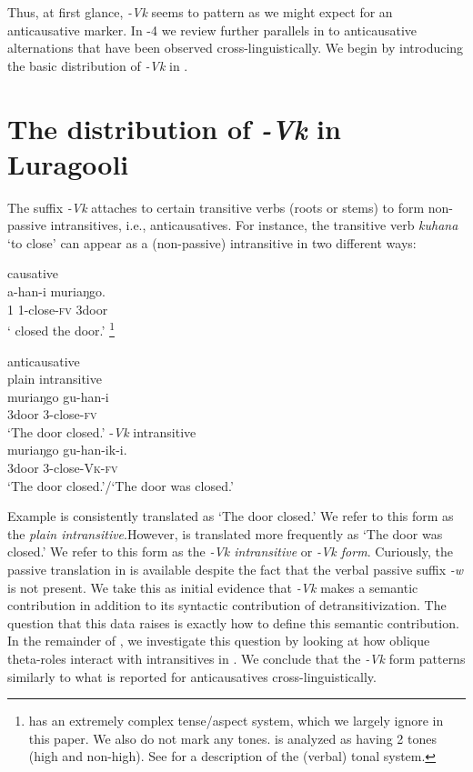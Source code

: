 \documentclass[output=paper]{langsci/lanmgscibook}
\begin{document}
Thus, at first glance, \textit{-Vk} seems to pattern as we might expect for an anticausative marker. In -4 we review further parallels in  to anticausative alternations that have been observed cross-linguistically. We begin  by introducing the basic distribution of \textit{-Vk} in .

\section{The distribution of \textit{-Vk} in Luragooli}\label{sec:gluckman:3}

The suffix \textit{-Vk} attaches to certain transitive verbs (roots or stems) to form non-passive intransitives, i.e., anticausatives. For instance, the  transitive verb \textit{kuhana} ‘to close’ can appear as a (non-passive) intransitive in two different ways:

\ea\label{ex:gluckman:4}{causative}\\
\gll {}    a-han-i      muriaŋgo.      \\
     1 1-close-\textsc{fv}  3door\\
\glt ‘ closed the door.’
\footnote{ has an extremely complex tense/aspect system, which we largely ignore in this paper. We also do not mark any tones.  is analyzed as having 2 tones (high and non-high). See \citet{SamuelsPaster2015} for a description of the  (verbal) tonal system.}
\z

\ea\label{ex:gluckman:5} 
{anticausative}\\
\ea\label{ex:gluckman:5a}{plain intransitive}\\ 
\gll muriaŋgo gu-han-i       \\
       3door       3-close-\textsc{fv}\\ 
\glt ‘The door closed.’
\ex\label{ex:gluckman:5b}{-\textit{Vk} intransitive}\\ 
\gll muriaŋgo gu-han-ik-i.       \\
       3door         3-close-\textsc{Vk}-\textsc{fv}\\
\glt ‘The door closed.’/‘The door was closed.’
\z
\z

Example  is consistently translated as ‘The door closed.’ We refer to this form as the \textit{plain intransitive}.However,  is translated more frequently as ‘The door was closed.’ We refer to this form as the \textit{-Vk intransitive} or \textit{-Vk form}. Curiously, the  passive translation in  is available despite the fact that the verbal passive suffix \textit{-w} is not present. We take this as initial evidence that \textit{-Vk} makes a semantic contribution in addition to its syntactic contribution of detransitivization. The question that this data raises is exactly how to define this semantic contribution. In the remainder of , we investigate this question by looking at how oblique theta-roles interact with intransitives in . We conclude that the  \textit{-Vk} form patterns similarly to what is reported for anticausatives cross-linguistically.
\end{document}
